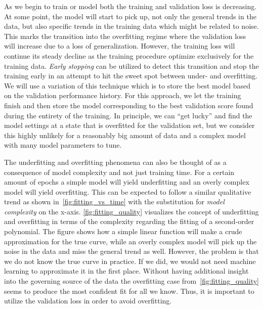 As we begin to train or
model both the training and validation loss is decreasing. At some point, the
model will start to pick up, not only the general trends in the data, but also
specific trends in the training data which might be related to noise. This marks
the transition into the overfitting regime where the validation loss will
increase due to a loss of generalization. However, the training loss will
continue its steady decline as the training procedure optimize exclusively for
the training data. \textit{Early stopping} can be utilized to detect this
transition and stop the training early in an attempt to hit the sweet spot
between under- and overfitting. We will use a variation of this technique which
is to store the best model based on the validation performance history. For this
approach, we let the training finish and then store the model corresponding to
the best validation score found during the entirety of the training. In
principle, we can ``get lucky'' and find the model settings at a state that is
overfitted for the validation set, but we consider this highly unlikely for a
reasonably big amount of data and a complex model with many model parameters to
tune.


The underfitting and overfitting phenomena can also be thought of as a
consequence of model complexity and not just training time. For a certain amount
of epochs a simple model will yield underfitting and an overly complex model
will yield overfitting. This can be expected to follow a similar qualitative
trend as shown in~\cref{fig:fitting_vs_time} with the substitution for
\textit{model complexity} on the x-axis. \cref{fig:fitting_quality} visualizes
the concept of underfitting and overfitting in terms of the complexity regarding
the fitting of a second-order polynomial. The figure shows how a simple linear
function will make a crude approximation for the true curve, while an overly
complex model will pick up the noise in the data and miss the general trend as
well. However, the problem is that we do not know the true curve in practice. If
we did, we would not need machine learning to approximate it in the first place.
Without having additional insight into the governing source of the data the
overfitting case from~\cref{fig:fitting_quality} seems to produce the most confident fit for all we know. Thus, it is important to utilize the validation loss in order to avoid overfitting. 




